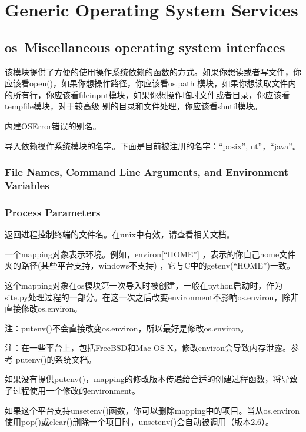 \chapter{Generic Operating System Services}
\section{os--Miscellaneous operating system interfaces}
该模块提供了方便的使用操作系统依赖的函数的方式。如果你想读或者写文件，你应该看open()，如果你想操作路径，你应该看os.path
模块，如果你想读取文件内的所有行，你应该看fileinput模块，如果你想操作临时文件或者目录，你应该看tempfile模块，对于较高级
别的目录和文件处理，你应该看shutil模块。

\noindent{\color{red}{os.error:}}
\par{内建OSError错误的别名。}\\

\noindent{\color{red}{os.name:}}
\par{导入依赖操作系统模块的名字。下面是目前被注册的名字：“posix”, nt”，“java”。}





\subsection{File Names, Command Line Arguments, and Environment Variables}






\subsection{Process Parameters}
\noindent{\color{red}{os.ctermid():}}
\par{返回进程控制终端的文件名。在unix中有效，请查看相关文档。}\\

\noindent{\color{red}{os.environ:}}
\par{一个mapping对象表示环境。例如，environ[“HOME”] ，表示的你自己home文件夹的路径(某些平台支持，windows不支持)
，它与C中的getenv(“HOME”)一致。}
\par{这个mapping对象在os模块第一次导入时被创建，一般在python启动时，作为site.py处理过程的一部分。在这一次之后改变environment不影响os.environ，除非直接修改os.environ。}
\par{注：putenv()不会直接改变os.environ，所以最好是修改os.environ。}
\par{注：在一些平台上，包括FreeBSD和Mac OS X，修改environ会导致内存泄露。参考 putenv()的系统文档。}
\par{如果没有提供putenv()，mapping的修改版本传递给合适的创建过程函数，将导致子过程使用一个修改的environment。}
\par{如果这个平台支持unsetenv()函数，你可以删除mapping中的项目。当从os.environ使用pop()或clear()删除一个项目时，unsetenv()会自动被调用（版本2.6）。}\\

